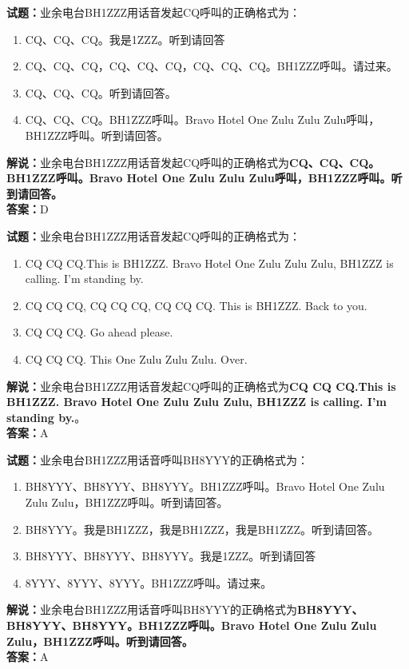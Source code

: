 \documentclass{ctexbook}
\begin{document}
\bigskip

\noindent\textbf{试题：}业余电台BH1ZZZ用话音发起CQ呼叫的正确格式为：
\begin{enumerate}[leftmargin=3em]
  \item CQ、CQ、CQ。我是1ZZZ。听到请回答
  \item CQ、CQ、CQ，CQ、CQ、CQ，CQ、CQ、CQ。BH1ZZZ呼叫。请过来。
  \item CQ、CQ、CQ。听到请回答。
  \item CQ、CQ、CQ。BH1ZZZ呼叫。Bravo Hotel One Zulu Zulu Zulu呼叫，BH1ZZZ呼叫。听到请回答。
\end{enumerate}
\noindent\textbf{解说：}业余电台BH1ZZZ用话音发起CQ呼叫的正确格式为\textbf{CQ、CQ、CQ。BH1ZZZ呼叫。Bravo Hotel One Zulu Zulu Zulu呼叫，BH1ZZZ呼叫。听到请回答。}\\\noindent\textbf{答案：}D

\bigskip

\noindent\textbf{试题：}业余电台BH1ZZZ用话音发起CQ呼叫的正确格式为：
\begin{enumerate}[leftmargin=3em]
  \item CQ CQ CQ.This is BH1ZZZ. Bravo Hotel One Zulu Zulu Zulu, BH1ZZZ is calling. I’m standing by.
  \item CQ CQ CQ, CQ CQ CQ, CQ CQ CQ. This is BH1ZZZ. Back to you.
  \item CQ CQ CQ. Go ahead please.
  \item CQ CQ CQ. This One Zulu Zulu Zulu. Over.
\end{enumerate}
\noindent\textbf{解说：}业余电台BH1ZZZ用话音发起CQ呼叫的正确格式为\textbf{CQ CQ CQ.This is BH1ZZZ. Bravo Hotel One Zulu Zulu Zulu, BH1ZZZ is calling. I’m standing by.}。\\\noindent\textbf{答案：}A

\bigskip

\noindent\textbf{试题：}业余电台BH1ZZZ用话音呼叫BH8YYY的正确格式为：
\begin{enumerate}[leftmargin=3em]
  \item BH8YYY、BH8YYY、BH8YYY。BH1ZZZ呼叫。Bravo Hotel One Zulu Zulu Zulu，BH1ZZZ呼叫。听到请回答。
  \item BH8YYY。我是BH1ZZZ，我是BH1ZZZ，我是BH1ZZZ。听到请回答。
  \item BH8YYY、BH8YYY、BH8YYY。我是1ZZZ。听到请回答
  \item 8YYY、8YYY、8YYY。BH1ZZZ呼叫。请过来。
\end{enumerate}
\noindent\textbf{解说：}业余电台BH1ZZZ用话音呼叫BH8YYY的正确格式为\textbf{BH8YYY、BH8YYY、BH8YYY。BH1ZZZ呼叫。Bravo Hotel One Zulu Zulu Zulu，BH1ZZZ呼叫。听到请回答。}\\\noindent\textbf{答案：}A
\end{document}
